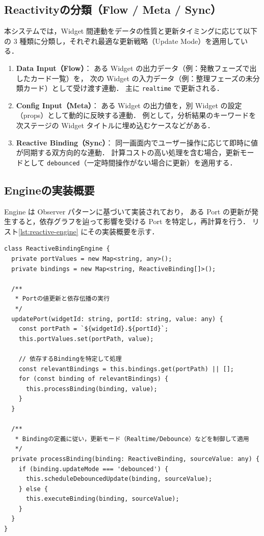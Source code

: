 \documentclass[senior,final,11pt,dvipdfmx]{iputit-thesis}
\begin{document}
\subsection{Reactivityの分類（Flow / Meta / Sync）}
本システムでは，Widget 間連動をデータの性質と更新タイミングに応じて以下の 3 種類に分類し，それぞれ最適な更新戦略（Update Mode）を適用している．

\begin{enumerate}
  \item \textbf{Data Input（Flow）}：
        ある Widget の出力データ（例：発散フェーズで出したカード一覧）を，
        次の Widget の入力データ（例：整理フェーズの未分類カード）として受け渡す連動．
        主に \texttt{realtime} で更新される．
  \item \textbf{Config Input（Meta）}：
        ある Widget の出力値を，別 Widget の設定（props）として動的に反映する連動．
        例として，分析結果のキーワードを次ステージの Widget タイトルに埋め込むケースなどがある．
  \item \textbf{Reactive Binding（Sync）}：
        同一画面内でユーザー操作に応じて即時に値が同期する双方向的な連動．
        計算コストの高い処理を含む場合，更新モードとして \texttt{debounced}（一定時間操作がない場合に更新）を適用する．
\end{enumerate}

\subsection{Engineの実装概要}
Engine は Observer パターンに基づいて実装されており，
ある Port の更新が発生すると，依存グラフを辿って影響を受ける Port を特定し，再計算を行う．
リスト\ref{lst:reactive-engine} にその実装概要を示す．

\begin{lstlisting}[caption = ReactiveBindingEngineの実装概要（TypeScript）, label = lst:reactive-engine]
class ReactiveBindingEngine {
  private portValues = new Map<string, any>();
  private bindings = new Map<string, ReactiveBinding[]>();

  /**
   * Portの値更新と依存伝播の実行
   */
  updatePort(widgetId: string, portId: string, value: any) {
    const portPath = `${widgetId}.${portId}`;
    this.portValues.set(portPath, value);

    // 依存するBindingを特定して処理
    const relevantBindings = this.bindings.get(portPath) || [];
    for (const binding of relevantBindings) {
      this.processBinding(binding, value);
    }
  }

  /**
   * Bindingの定義に従い，更新モード（Realtime/Debounce）などを制御して適用
   */
  private processBinding(binding: ReactiveBinding, sourceValue: any) {
    if (binding.updateMode === 'debounced') {
      this.scheduleDebouncedUpdate(binding, sourceValue);
    } else {
      this.executeBinding(binding, sourceValue);
    }
  }
}
\end{lstlisting}
\end{document}
